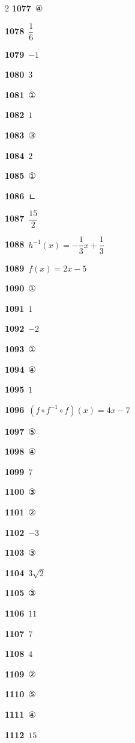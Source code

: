 \documentclass[10pt,a4paper]{article}
\begin{document}
\begin{multicols}{2}
\noindent\textbf{1077}\ ④\par
\noindent\textbf{1078}\ $\dfrac{1}{6}$\par
\noindent\textbf{1079}\ $-1$\par
\noindent\textbf{1080}\ $3$\par
\noindent\textbf{1081}\ ①\par
\noindent\textbf{1082}\ $1$\par
\noindent\textbf{1083}\ ③\par
\noindent\textbf{1084}\ $2$\par
\noindent\textbf{1085}\ ①\par
\noindent\textbf{1086}\ ㄴ\par
\noindent\textbf{1087}\ $\dfrac{15}{2}$\par
\noindent\textbf{1088}\ $h^{-1}(x)=-\dfrac{1}{3}x+\dfrac{1}{3}$\par
\noindent\textbf{1089}\ $f(x)=2x-5$\par
\noindent\textbf{1090}\ ①\par
\noindent\textbf{1091}\ $1$\par
\noindent\textbf{1092}\ $-2$\par
\noindent\textbf{1093}\ ①\par
\noindent\textbf{1094}\ ④\par
\noindent\textbf{1095}\ $1$\par
\noindent\textbf{1096}\ $(f\circ f^{-1}\circ f)(x)=4x-7$\par
\noindent\textbf{1097}\ ⑤\par
\noindent\textbf{1098}\ ④\par
\noindent\textbf{1099}\ $7$\par
\noindent\textbf{1100}\ ③\par
\noindent\textbf{1101}\ ②\par
\noindent\textbf{1102}\ $-3$\par
\noindent\textbf{1103}\ ③\par
\noindent\textbf{1104}\ $3\sqrt{2}$\par
\noindent\textbf{1105}\ ③\par
\noindent\textbf{1106}\ $11$\par
\noindent\textbf{1107}\ $7$\par
\noindent\textbf{1108}\ $4$\par
\noindent\textbf{1109}\ ②\par
\noindent\textbf{1110}\ ⑤\par
\noindent\textbf{1111}\ ④\par
\noindent\textbf{1112}\ $15$\par

\end{multicols}
\end{document}

